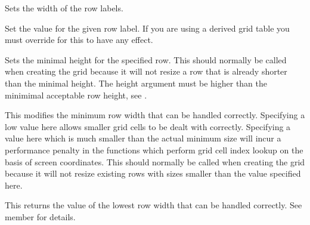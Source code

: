 Sets the width of the row labels.

\label{wxgridsetrowlabelvalue}


Set the value for the given row label. If you are using a derived grid table you must 
override  
for this to have any effect.

\label{wxgridsetrowminimalheight}


Sets the minimal height for the specified row. This should normally be called when creating the grid
because it will not resize a row that is already shorter than the minimal height.
The height argument must be higher than the minimimal acceptable row height, see
.

\label{wxgridsetrowminimalacceptableheight}


This modifies the minimum row width that can be handled correctly. Specifying a low value here
allows smaller grid cells to be dealt with correctly. Specifying a value here which is much smaller
than the actual minimum size will incur a performance penalty in the functions which perform
grid cell index lookup on the basis of screen coordinates.
This should normally be called when creating the grid because it will not resize existing rows
with sizes smaller than the value specified here. 

\label{wxgridgetrowminimalacceptableheight}


This returns the value of the lowest row width that can be handled correctly. See
member  for details.

\label{wxgridsetrowsize}


